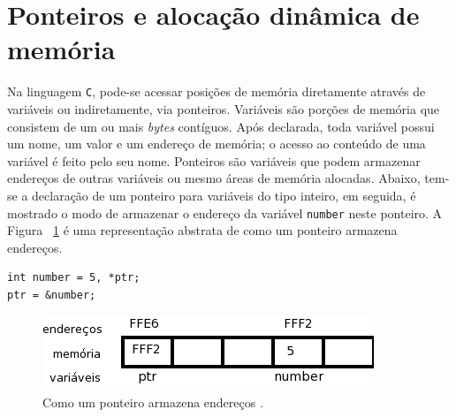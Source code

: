 \documentclass[ccc, pg2]{esinucpel}
\begin{document}

\section{Ponteiros e alocação dinâmica de memória} \label{sec:ptr}
Na linguagem \texttt{C}, pode-se acessar posições de memória diretamente através de variáveis ou indiretamente, via ponteiros. Variáveis são porções de memória que consistem de um ou mais \textit{bytes} contíguos. Após declarada, toda variável possui um nome, um valor e um endereço de memória; o acesso ao conteúdo de uma variável é feito pelo seu nome. Ponteiros são variáveis que podem armazenar endereços de outras variáveis ou mesmo áreas de memória alocadas. Abaixo, tem-se a declaração de um ponteiro para variáveis do tipo inteiro, em seguida, é mostrado o modo de armazenar o endereço da variável \texttt{number} neste ponteiro. A Figura ~\ref{fig:ptr} é uma representação abstrata de como um ponteiro armazena endereços.

\begin{verbatim}
int number = 5, *ptr;
ptr = &number;
\end{verbatim}

\begin{figure}[htbp]
\centering
\includegraphics[width=.6\textwidth]{images/pointer.png}
\caption{Como um ponteiro armazena endereços \cite{bib:horton:begc}.}
\label{fig:ptr}
\end{figure}
\end{document}
